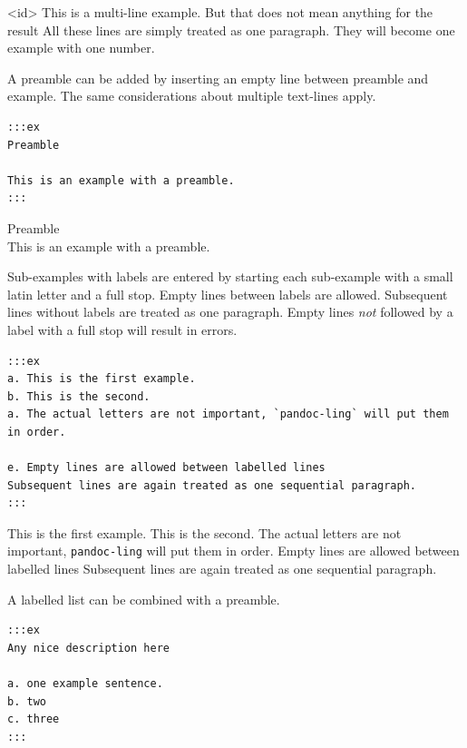 \documentclass[
]{article}
\begin{document}
\begin{samepage}
\ex<id> 
  This is a multi-line example. But that does not mean anything for the
result All these lines are simply treated as one paragraph. They will
become one example with one number.
\xe
\end{samepage}

A preamble can be added by inserting an empty line between preamble and
example. The same considerations about multiple text-lines apply.

\begin{verbatim}
:::ex
Preamble

This is an example with a preamble.
:::
\end{verbatim}

\begin{samepage}
 Preamble\\
  This is an example with a preamble.
\xe
\end{samepage}

Sub-examples with labels are entered by starting each sub-example with a
small latin letter and a full stop. Empty lines between labels are
allowed. Subsequent lines without labels are treated as one paragraph.
Empty lines \emph{not} followed by a label with a full stop will result
in errors.

\begin{verbatim}
:::ex
a. This is the first example.
b. This is the second.
a. The actual letters are not important, `pandoc-ling` will put them in order.

e. Empty lines are allowed between labelled lines
Subsequent lines are again treated as one sequential paragraph.
:::
\end{verbatim}

\begin{samepage}
  \a This is the first example.
  \a This is the second.
  \a The actual letters are not important, \texttt{pandoc-ling} will put
them in order.
  \a Empty lines are allowed between labelled lines Subsequent lines are
again treated as one sequential paragraph.
\xe
\end{samepage}

A labelled list can be combined with a preamble.

\begin{verbatim}
:::ex
Any nice description here

a. one example sentence.
b. two
c. three
:::
\end{verbatim}
\end{document}
